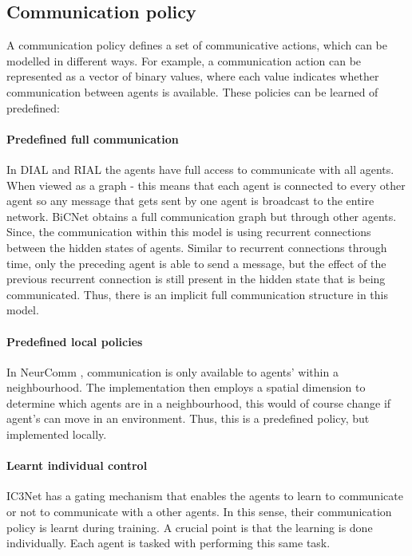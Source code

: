 \documentclass{article}
\begin{document}
\subsection{Communication policy}

A communication policy defines a set of communicative actions, which can be modelled in different ways. For example, a communication action can be represented as a vector of binary values, where each value indicates whether communication between agents is available. These policies can be learned of predefined:

\paragraph{Predefined full communication} In DIAL and RIAL \citet{foerster2016learning} the agents have full access to communicate with all agents. When viewed as a graph - this means that each agent is connected to every other agent so any message that gets sent by one agent is broadcast to the entire network. BiCNet \citep{peng2017bicnet} obtains a full communication graph but through other agents. Since, the communication within this model is using recurrent connections between the hidden states of agents. Similar to recurrent connections through time, only the preceding agent is able to send a message, but the effect of the previous recurrent connection is still present in the hidden state that is being communicated. Thus, there is an implicit full communication structure in this model. 

\paragraph{Predefined local policies} In NeurComm \citep{chu2020NeurComm}, communication is only available to agents' within a neighbourhood. The implementation then employs a spatial dimension to determine which agents are in a neighbourhood, this would of course change if agent's can move in an environment. Thus, this is a predefined policy, but implemented locally.

\paragraph{Learnt individual control} IC3Net \citep{singh2018ic3net} has a gating mechanism that enables the agents to learn to communicate or not to communicate with a other agents. In this sense, their communication policy is learnt during training. A crucial point is that the learning is done individually. Each agent is tasked with performing this same task.
\end{document}
